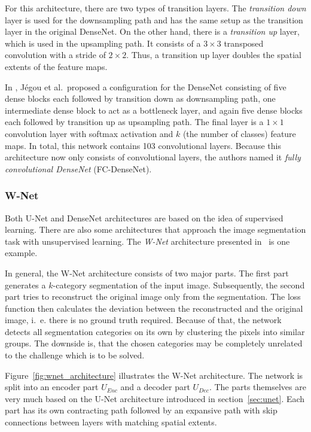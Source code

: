 For this architecture, there are two types of transition layers. The \emph{transition down} layer is used for the downsampling path and has the same setup as the transition layer in the original DenseNet. On the other hand, there is a \emph{transition up} layer, which is used in the upsampling path. It consists of a $3\times 3$ transposed convolution with a stride of $2\times 2$. Thus, a transition up layer doubles the spatial extents of the feature maps.

In \cite{denseseg17}, Jégou et al.\ proposed a configuration for the DenseNet consisting of five dense blocks each followed by transition down as downsampling path, one intermediate dense block to act as a bottleneck layer, and again five dense blocks each followed by transition up as upsampling path. The final layer is a $1\times 1$ convolution layer with softmax activation and $k$ (the number of classes) feature maps. In total, this network contains 103 convolutional layers. Because this architecture now only consists of convolutional layers, the authors named it \emph{fully convolutional DenseNet} (FC-DenseNet).

\subsubsection{W-Net}
\label{sec:w-net}
Both U-Net and DenseNet architectures are based on the idea of supervised learning. There are also some architectures that approach the image segmentation task with unsupervised learning. The \emph{W-Net} architecture presented in~\cite{wnet17} is one example.

In general, the W-Net architecture consists of two major parts. The first part generates a $k$-category segmentation of the input image. Subsequently, the second part tries to reconstruct the original image only from the segmentation. The loss function then calculates the deviation between the reconstructed and the original image, i.~e. there is no ground truth required. Because of that, the network detects all segmentation categories on its own by clustering the pixels into similar groups. The downside is, that the chosen categories may be completely unrelated to the challenge which is to be solved.

Figure~\ref{fig:wnet_architecture} illustrates the W-Net architecture. The network is split into an encoder part $U_{Enc}$ and a decoder part $U_{Dec}$. The parts themselves are very much based on the U-Net architecture introduced in section~\ref{sec:unet}. Each part has its own contracting path followed by an expansive path with skip connections between layers with matching spatial extents.

